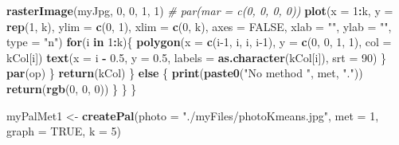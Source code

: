 \documentclass[
]{book}
\newenvironment{Shaded}{\begin{snugshade}}{\end{snugshade}}
\newcommand{\CommentTok}[1]{\textcolor[rgb]{0.56,0.35,0.01}{\textit{#1}}}
\newcommand{\ControlFlowTok}[1]{\textcolor[rgb]{0.13,0.29,0.53}{\textbf{#1}}}
\newcommand{\DataTypeTok}[1]{\textcolor[rgb]{0.13,0.29,0.53}{#1}}
\newcommand{\DecValTok}[1]{\textcolor[rgb]{0.00,0.00,0.81}{#1}}
\newcommand{\FloatTok}[1]{\textcolor[rgb]{0.00,0.00,0.81}{#1}}
\newcommand{\KeywordTok}[1]{\textcolor[rgb]{0.13,0.29,0.53}{\textbf{#1}}}
\newcommand{\NormalTok}[1]{#1}
\newcommand{\OperatorTok}[1]{\textcolor[rgb]{0.81,0.36,0.00}{\textbf{#1}}}
\newcommand{\OtherTok}[1]{\textcolor[rgb]{0.56,0.35,0.01}{#1}}
\newcommand{\StringTok}[1]{\textcolor[rgb]{0.31,0.60,0.02}{#1}}
\begin{document}
\begin{Shaded}
\begin{Highlighting}[]
                \KeywordTok{rasterImage}\NormalTok{(myJpg, }\DecValTok{0}\NormalTok{, }\DecValTok{0}\NormalTok{, }\DecValTok{1}\NormalTok{, }\DecValTok{1}\NormalTok{)}
                \CommentTok{# par(mar = c(0, 0, 0, 0))}
                \KeywordTok{plot}\NormalTok{(}\DataTypeTok{x =} \DecValTok{1}\OperatorTok{:}\NormalTok{k, }\DataTypeTok{y =} \KeywordTok{rep}\NormalTok{(}\DecValTok{1}\NormalTok{, k), }\DataTypeTok{ylim =} \KeywordTok{c}\NormalTok{(}\DecValTok{0}\NormalTok{, }\DecValTok{1}\NormalTok{), }
                    \DataTypeTok{xlim =} \KeywordTok{c}\NormalTok{(}\DecValTok{0}\NormalTok{, k), }\DataTypeTok{axes =} \OtherTok{FALSE}\NormalTok{, }\DataTypeTok{xlab =} \StringTok{""}\NormalTok{, }
                    \DataTypeTok{ylab =} \StringTok{""}\NormalTok{, }\DataTypeTok{type =} \StringTok{"n"}\NormalTok{)}
                \ControlFlowTok{for}\NormalTok{(i }\ControlFlowTok{in} \DecValTok{1}\OperatorTok{:}\NormalTok{k)\{}
                    \KeywordTok{polygon}\NormalTok{(}\DataTypeTok{x =} \KeywordTok{c}\NormalTok{(i}\DecValTok{-1}\NormalTok{, i, i, i}\DecValTok{-1}\NormalTok{), }\DataTypeTok{y =} \KeywordTok{c}\NormalTok{(}\DecValTok{0}\NormalTok{, }\DecValTok{0}\NormalTok{, }\DecValTok{1}\NormalTok{, }\DecValTok{1}\NormalTok{), }
                        \DataTypeTok{col =}\NormalTok{ kCol[i])}
                    \KeywordTok{text}\NormalTok{(}\DataTypeTok{x =}\NormalTok{ i }\OperatorTok{-}\StringTok{ }\FloatTok{0.5}\NormalTok{, }\DataTypeTok{y =} \FloatTok{0.5}\NormalTok{, }
                        \DataTypeTok{labels =} \KeywordTok{as.character}\NormalTok{(kCol[i]), }\DataTypeTok{srt =} \DecValTok{90}\NormalTok{)}
\NormalTok{                \}}
                \KeywordTok{par}\NormalTok{(op)}
\NormalTok{            \}}
            \KeywordTok{return}\NormalTok{(kCol)}
\NormalTok{        \} }\ControlFlowTok{else}\NormalTok{ \{}
            \KeywordTok{print}\NormalTok{(}\KeywordTok{paste0}\NormalTok{(}\StringTok{"No method "}\NormalTok{, met, }\StringTok{"."}\NormalTok{))}
            \KeywordTok{return}\NormalTok{(}\KeywordTok{rgb}\NormalTok{(}\DecValTok{0}\NormalTok{, }\DecValTok{0}\NormalTok{, }\DecValTok{0}\NormalTok{))}
\NormalTok{        \}}
\NormalTok{    \}}
\NormalTok{\}}

\NormalTok{myPalMet1 <-}\StringTok{ }\KeywordTok{createPal}\NormalTok{(}\DataTypeTok{photo =} \StringTok{"./myFiles/photoKmeans.jpg"}\NormalTok{, }
  \DataTypeTok{met =} \DecValTok{1}\NormalTok{, }\DataTypeTok{graph =} \OtherTok{TRUE}\NormalTok{, }\DataTypeTok{k =} \DecValTok{5}\NormalTok{)}
\end{Highlighting}
\end{Shaded}
\end{document}
